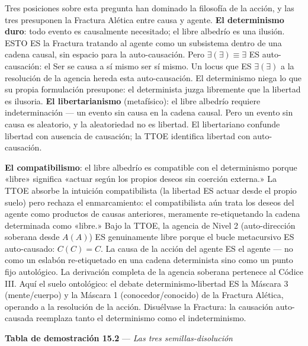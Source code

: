 \documentclass[10pt, openany, oneside]{book}
\begin{document}
Tres posiciones sobre esta pregunta han dominado la filosofía de la acción, y las tres presuponen la Fractura Alética entre causa y agente. \textbf{El determinismo duro}: todo evento es causalmente necesitado; el libre albedrío es una ilusión. ESTO ES la Fractura tratando al agente como un subsistema dentro de una cadena causal, sin espacio para la auto-causación. Pero $\exists(\exists) \equiv \exists$ ES auto-causación: el Ser se causa a sí mismo ser sí mismo. Un locus que ES $\exists(\exists)$ a la resolución de la agencia hereda esta auto-causación. El determinismo niega lo que su propia formulación presupone: el determinista juzga libremente que la libertad es ilusoria. \textbf{El libertarianismo} (metafísico): el libre albedrío requiere indeterminación --- un evento sin causa en la cadena causal. Pero un evento sin causa es aleatorio, y la aleatoriedad no es libertad. El libertariano confunde libertad con ausencia de causación; la TTOE identifica libertad con auto-causación.

\textbf{El compatibilismo}: el libre albedrío es compatible con el determinismo porque «libre» significa «actuar según los propios deseos sin coerción externa.» La TTOE absorbe la intuición compatibilista (la libertad ES actuar desde el propio suelo) pero rechaza el enmarcamiento: el compatibilista aún trata los deseos del agente como productos de causas anteriores, meramente re-etiquetando la cadena determinada como «libre.» Bajo la TTOE, la agencia de Nivel 2 (auto-dirección soberana desde $A(A)$) ES genuinamente libre porque el bucle metacursivo ES auto-causado: $C(C) = C$. La causa de la acción del agente ES el agente --- no como un eslabón re-etiquetado en una cadena determinista sino como un punto fijo autológico. La derivación completa de la agencia soberana pertenece al Códice III. Aquí el suelo ontológico: el debate determinismo-libertad ES la Máscara 3 (mente/cuerpo) y la Máscara 1 (conocedor/conocido) de la Fractura Alética, operando a la resolución de la acción. Disuélvase la Fractura: la causación auto-causada reemplaza tanto el determinismo como el indeterminismo.

\vspace{0.5em}

\textbf{Tabla de demostración 15.2} --- \textit{Las tres semillas-disolución}

\vspace{0.5em}
\end{document}

